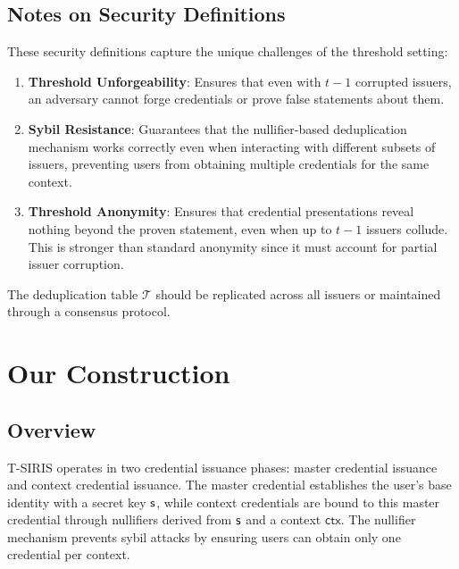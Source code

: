 \subsection{Notes on Security Definitions}

These security definitions capture the unique challenges of the threshold setting:

\begin{enumerate}
    \item \textbf{Threshold Unforgeability}: Ensures that even with $t-1$ corrupted issuers, an adversary cannot forge credentials or prove false statements about them.

    \item \textbf{Sybil Resistance}: Guarantees that the nullifier-based deduplication mechanism works correctly even when interacting with different subsets of issuers, preventing users from obtaining multiple credentials for the same context.

    \item \textbf{Threshold Anonymity}: Ensures that credential presentations reveal nothing beyond the proven statement, even when up to $t-1$ issuers collude. This is stronger than standard anonymity since it must account for partial issuer corruption.
\end{enumerate}

The deduplication table $\mathcal{T}$ should be replicated across all issuers or maintained through a consensus protocol.


















\section{Our Construction}

\subsection{Overview}
T-SIRIS operates in two credential issuance phases: master credential issuance and context credential issuance. The master credential establishes the user's base identity with a secret key $\mathsf{s}$, while context credentials are bound to this master credential through nullifiers derived from $\mathsf{s}$ and a context $\mathsf{ctx}$. The nullifier mechanism prevents sybil attacks by ensuring users can obtain only one credential per context.


